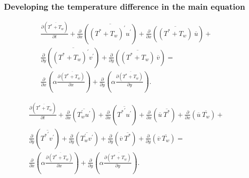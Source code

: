 \documentclass[xcolor=dvipsnames,8pt,aspectratio=34]{beamer}
\begin{document}
		
		
		
		\begin{frame}
		\frametitle{Developing the temperature difference in the main equation}
		\begin{equation}
		\begin{split}
		\frac{\partial ( \overline{T^\ast + T_w}  ) }{\partial t} +
		\frac{\partial{}}{\partial{x}} \left(\overline{(T^\ast + T_w)^\prime u^\prime}\right) + \frac{\partial{}}{\partial{x}}\left(\overline{(T^\ast + T_w)} \ \overline{u}\right)+  \\
		\frac{\partial{}}{\partial{y}} \left(\overline{(T^\ast + T_w)^\prime v^\prime}\right) + \frac{\partial{}}{\partial{y}}\left(\overline{(T^\ast + T_w)} \ \overline{v}\right) = \\
		{\frac{\partial{}}{\partial{x}}} \left(\alpha {\frac{\partial{\overline{(T^\ast + T_w)}}}{\partial{x}}} \right) +
		{\frac{\partial{}}{\partial{y}}} \left(\alpha {\frac{\partial{\overline{(T^\ast + T_w)}}}{\partial{y}}} \right) .
		\end{split}
		\end{equation}
		\begin{center}\begin{equation}\begin{split}
		\frac{\partial ( \overline{ T^\ast + T_w } ) }{\partial t} +
		\frac{\partial{}}{\partial{x}} \left(\overline{T_w^{\prime} u^{\prime}}\right) +\frac{\partial{}}{\partial{x}} \left(\overline{{T^{\ast}}^{\prime} u^{\prime}}\right)
		+\frac{\partial{}}{\partial{x}}\left(\overline{u} \ \overline{T^{\ast}}\right)+ 
		\frac{\partial{}}{\partial{x}}\left(\overline{u} \ \overline{T_w}\right)+ 
		\\
		\frac{\partial{}}{\partial{y}} \left(\overline{{T^{\ast}}^{\prime} v^{\prime}}\right)+
		\frac{\partial{}}{\partial{y}} \left(\overline{T_w^\prime v^\prime}\right) + \frac{\partial{}}{\partial{y}}\left(\overline{v} \ \overline{T^\ast}\right) +
		\frac{\partial{}}{\partial{y}}\left(\overline{v} \ \overline{T_w}\right) 
		= 
		\\
		{\frac{\partial{}}{\partial{x}}} \left(\alpha {\frac{\partial{\overline{(T^\ast + T_w)}}}{\partial{x}}} \right) +
		{\frac{\partial{}}{\partial{y}}} \left(\alpha {\frac{\partial{\overline{(T^\ast + T_w)}}}{\partial{y}}} \right) .
		\end{split}\end{equation}\end{center}
		\end{frame}
		
\end{document}
